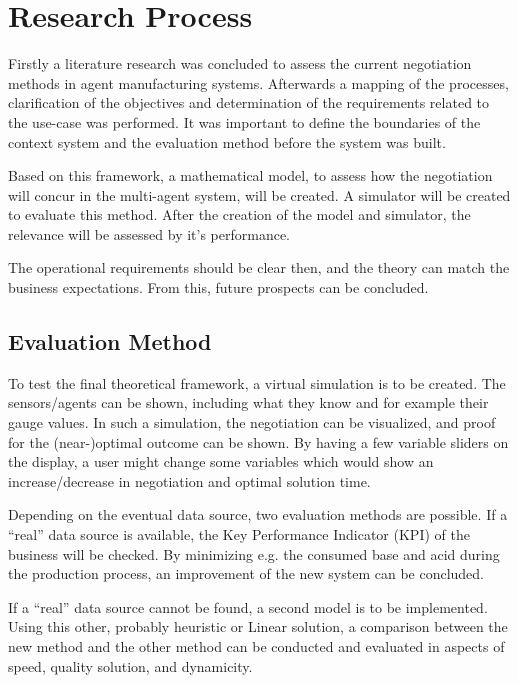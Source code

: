 \section{Research Process}
Firstly a literature research was concluded to assess the current negotiation methods in agent manufacturing systems. Afterwards a mapping of the processes, clarification of the objectives and determination of the requirements related to the use-case was performed. It was important to define the boundaries of the context system and the evaluation method before the system was built.

Based on this framework, a mathematical model, to assess how the negotiation will concur in the multi-agent system, will be created. A simulator will be created to evaluate this method. After the creation of the model and simulator, the relevance will be assessed by it's performance.


The operational requirements should be clear then, and the theory can match the business expectations. From this, future prospects can be concluded.


\subsection{Evaluation Method}
To test the final theoretical framework, a virtual simulation is to be created. The sensors/agents can be shown, including what they know and for example their gauge values. In such a simulation, the negotiation can be visualized, and proof for the (near-)optimal outcome can be shown. By having a few variable sliders on the display, a user might change some variables which would show an increase/decrease in negotiation and optimal solution time. 

Depending on the eventual data source, two evaluation methods are possible. If a ``real'' data source is available, the Key Performance Indicator (KPI) of the business will be checked. By minimizing e.g. the consumed base and acid during the production process, an improvement of the new system can be concluded.

If a ``real'' data source cannot be found, a second model is to be implemented. Using this other, probably heuristic or Linear solution, a comparison between the new method and the other method can be conducted and evaluated in aspects of speed, quality solution, and dynamicity.

